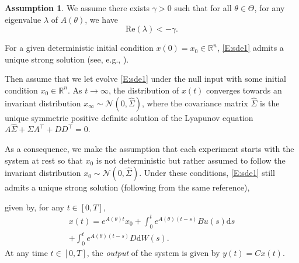 \documentclass[twocolumn]{autart}
\newcommand{\ludo}{\color{ForestGreen}}
\theoremstyle{definition}
\newtheorem{assumption}[theorem]{Assumption}
\theoremstyle{remark}
\newcommand{\R}{\mathbb{R}}
\newcommand{\diff}{\mathrm{d}}
\begin{document}
\begin{assumption}\label{As:Gap}
We assume there exists $\gamma>0$ such that for all $\theta\in \Theta$, for any eigenvalue $\lambda$ of $A(\theta)$, we have
$$
\mathrm{Re}(\lambda)<-\gamma.
$$
\end{assumption}

For a given deterministic initial condition $x(0)=x_0\in \R^n$, \eqref{E:sde1} admits a unique strong solution  (see, e.g., \cite[Theorem 5.2.1]{oksendal2013stochastic}).
{\ludo
Then assume that we let evolve \eqref{E:sde1} under the null input with some initial condition $x_0\in \R^n$. As $t\to \infty$, the distribution of $x(t)$ converges towards an invariant distribution $x_\infty\sim \mathcal{N}(0,\hat\Sigma)$, where the covariance matrix $\hat \Sigma$ is the unique symmetric positive definite solution of the Lyapunov equation $A\hat \Sigma+\hat \Sigma A^\top + DD^\top = 0$.

As a consequence, we make the assumption that each experiment starts with the system at rest so that $x_0$ is not deterministic but rather assumed to follow the invariant distribution $x_0\sim \mathcal{N}(0,\hat\Sigma)$. Under these conditions, \eqref{E:sde1} still admits a unique strong solution (following from the same reference),}
given by, for any $t\in [0,T]$,
\begin{multline*}%
x(t)=e^{A(\theta)t}x_0+\int_0^t e^{A(\theta)(t-s)}Bu(s)\diff s
\\+
\int_0^t e^{A(\theta)(t-s)}D \diff W(s).
\end{multline*}
At any time $t\in [0,T]$, the \emph{output} of the system is given by $y(t)=C x(t)$.
\end{document}
